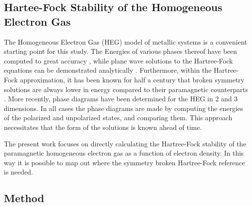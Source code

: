 \documentclass{revtex4}
\begin{document}
    \subsection{Hartee-Fock Stability of the Homogeneous Electron Gas}
    
    The Homogeneous Electron Gas (HEG) model of metallic systems is a convenient starting point 
    for 
    this study. The Energies of various phases thereof have been computed to great accuracy
    \cite{Ceperley1980}, while plane wave solutions to the Hartree-Fock equations can be 
    demonstrated analytically \cite{Phillips2012}. Furthermore, within the Hartree-Fock 
    approximation, it has been known for half a century that broken symmetry solutions are always 
    lower in energy compared to their paramagnetic counterparts \cite{Overhauser1962}. More 
    recently, phase diagrams have been determined for the 
    HEG in 2 and 3 dimensions\cite{Delyon2008}\cite{Bernu2011}\cite{Baguet2013}. In all cases the 
    phase diagrams are made by computing the energies of the polarized and unpolarized states, and 
    comparing them. This approach necessitates that the form of the solutions is known ahead of 
    time. 
    
    The present work focuses on directly calculating the Hartree-Fock stability of 
    the 
    paramagnetic homogeneous electron gas as a function of electron density. In this way it is 
    possible to map out where the symmetry broken Hartree-Fock reference is needed. 
    	
  \subsection{Method}
\end{document}
